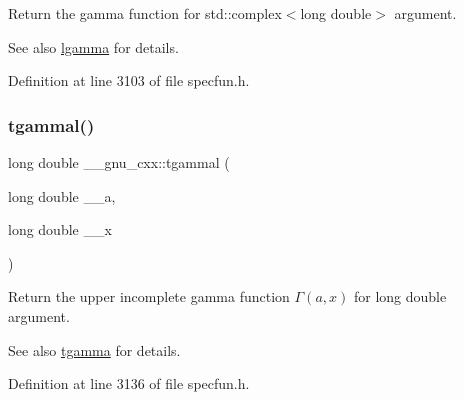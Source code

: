 Return the gamma function for {\ttfamily  std\+::complex$<$long double$>$ } argument.

\begin{DoxySeeAlso}{See also}
\hyperlink{group__gnu__math__spec__func_ga40fa5127f7c419ed1d8f1c6a6f96ea9b}{lgamma} for details. 
\end{DoxySeeAlso}


Definition at line 3103 of file specfun.\+h.

\mbox{\label{group__gnu__math__spec__func_gabebff9ffba6acf55f3a3cd716ef5007a}} 
\subsubsection{\texorpdfstring{tgammal()}{tgammal()}\hspace{0.1cm}{\footnotesize\ttfamily [3/3]}}
{\footnotesize\ttfamily long double \+\_\+\+\_\+gnu\+\_\+cxx\+::tgammal (\begin{DoxyParamCaption}\item[{long double}]{\+\_\+\+\_\+a,  }\item[{long double}]{\+\_\+\+\_\+x }\end{DoxyParamCaption})\hspace{0.3cm}{\ttfamily [inline]}}

Return the upper incomplete gamma function $ \Gamma(a,x) $ for {\ttfamily long double} argument.

\begin{DoxySeeAlso}{See also}
\hyperlink{group__gnu__math__spec__func_ga73a634663e4eceb1e6bcf3fc16773b7b}{tgamma} for details. 
\end{DoxySeeAlso}


Definition at line 3136 of file specfun.\+h.

\mbox{\label{group__gnu__math__spec__func_gaa2e5a3a5f550fe032a596a8b01c878c0}} 
